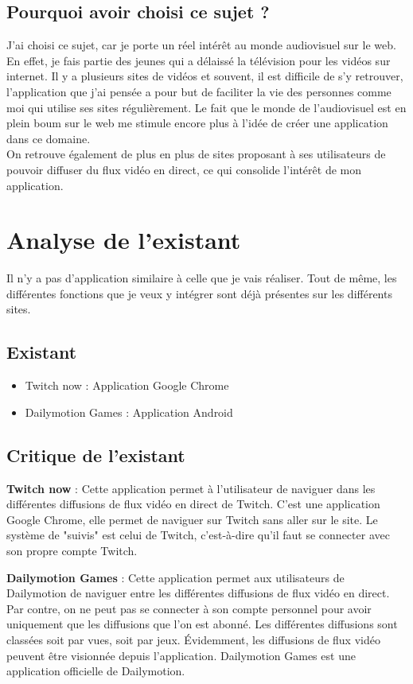 \documentclass[11pt]{report} %
\begin{document}
		\subsection{Pourquoi avoir choisi ce sujet ?}
		J'ai choisi ce sujet, car je porte un réel intérêt au monde audiovisuel sur le web. En effet, je fais partie des jeunes qui a délaissé la télévision pour les vidéos sur internet. Il y a plusieurs sites de vidéos et souvent, il est difficile de s'y retrouver, l'application que j'ai pensée a pour but de faciliter la vie des personnes comme moi qui utilise ses sites régulièrement. Le fait que le monde de l'audiovisuel est en plein boum sur le web me stimule encore plus à l'idée de créer une application dans ce domaine. \\
		On retrouve également de plus en plus de sites proposant à ses utilisateurs de pouvoir diffuser du flux vidéo en direct, ce qui consolide l'intérêt de mon application.

	\section{Analyse de l'existant}
	Il n'y a pas d'application similaire à celle que je vais réaliser. Tout de même, les différentes fonctions que je veux y intégrer sont déjà présentes sur les différents sites.
		\subsection{Existant}
		\begin{itemize}
			\item Twitch now : Application Google Chrome
			\item Dailymotion Games : Application Android
		\end{itemize}			
		\subsection{Critique de l'existant}	
		\textbf{Twitch now} : Cette application permet à l'utilisateur de naviguer dans les différentes diffusions de flux vidéo en direct de Twitch. C'est une application Google Chrome, elle permet de naviguer sur Twitch sans aller sur le site. Le système de "suivis" est celui de Twitch, c'est-à-dire qu'il faut se connecter avec son propre compte Twitch.
		
		\textbf{Dailymotion Games} : Cette application permet aux utilisateurs de Dailymotion de naviguer entre les différentes diffusions de flux vidéo en direct. Par contre, on ne peut pas se connecter à son compte personnel pour avoir uniquement que les diffusions que l'on est abonné. Les différentes diffusions sont classées soit par vues, soit par jeux. Évidemment, les diffusions de flux vidéo peuvent être visionnée depuis l'application.
		Dailymotion Games est une application officielle de Dailymotion.
		
\end{document}
